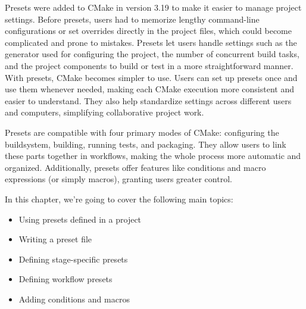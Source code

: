 Presets were added to CMake in version 3.19 to make it easier to manage project settings. Before presets, users had to memorize lengthy command-line configurations or set overrides directly in the project files, which could become complicated and prone to mistakes. Presets let users handle settings such as the generator used for configuring the project, the number of concurrent build tasks, and the project components to build or test in a more straightforward manner. With presets, CMake becomes simpler to use. Users can set up presets once and use them whenever needed, making each CMake execution more consistent and easier to understand. They also help standardize settings across different users and computers, simplifying collaborative project work.

Presets are compatible with four primary modes of CMake: configuring the buildsystem, building, running tests, and packaging. They allow users to link these parts together in workflows, making the whole process more automatic and organized. Additionally, presets offer features like conditions and macro expressions (or simply macros), granting users greater control.

In this chapter, we’re going to cover the following main topics:

\begin{itemize}
\item
Using presets defined in a project

\item
Writing a preset file

\item
Defining stage-specific presets

\item
Defining workflow presets

\item
Adding conditions and macros
\end{itemize}



